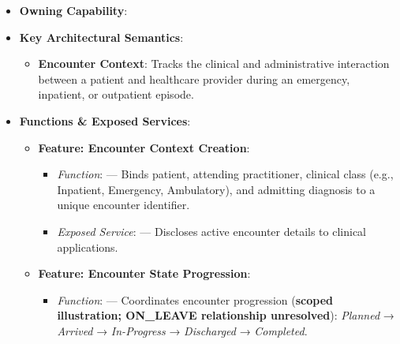 \begin{itemize}

\item 
\textbf{Owning Capability}: \texttt{}



\item 
\textbf{Key Architectural Semantics}:


\begin{itemize}

\item 
\textbf{Encounter Context}: Tracks the clinical and administrative interaction between a patient and healthcare provider during an emergency, inpatient, or outpatient episode.



\end{itemize}


\item 
\textbf{Functions \& Exposed Services}:


\begin{itemize}

\item 
\textbf{Feature: Encounter Context Creation}:


\begin{itemize}

\item 
\emph{Function}: \texttt{} — Binds patient, attending practitioner, clinical class (e.g., Inpatient, Emergency, Ambulatory), and admitting diagnosis to a unique encounter identifier.



\item 
\emph{Exposed Service}: \texttt{} — Discloses active encounter details to clinical applications.



\end{itemize}


\item 
\textbf{Feature: Encounter State Progression}:


\begin{itemize}

\item 
\emph{Function}: \texttt{} — Coordinates encounter progression (\textbf{scoped illustration; ON\_LEAVE relationship unresolved}): \emph{Planned} → \emph{Arrived} → \emph{In-Progress} → \emph{Discharged} → \emph{Completed}.




\end{itemize}
\end{itemize}
\end{itemize}
